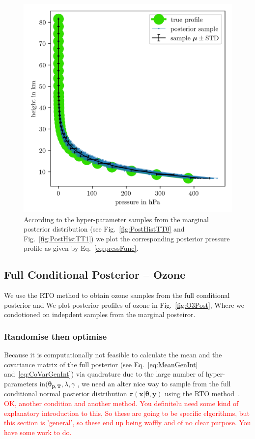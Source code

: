 \begin{figure}[ht!]
	\centering
	\includegraphics{PressPostMeanSigm.png}
	\caption[Pressure posterior samples.]{According to the hyper-parameter samples from the marginal posterior distribution (see Fig.~\ref{fig:PostHistTT0} and Fig.~\ref{fig:PostHistTT1}) we plot the corresponding posterior pressure profile as given by Eq.~\ref{eq:pressFunc}.}
	\label{fig:PressPost}
\end{figure}
\clearpage
\subsection{Full Conditional Posterior -- Ozone}
We use the RTO method to obtain ozone samples from the full conditional posterior and 
We plot posterior profiles of ozone in Fig.~\ref{fig:O3Post}, 
Where we condotioned on indepdent samples from the marginal posteiror.


\subsubsection{Randomise then optimise}
\label{subsec:RTO} 
Because it is computationally not feasible to calculate the mean and the covariance matrix of the full posterior (see Eq.~\ref{eq:MeanGenInt} and~\ref{eq:CoVarGenInt}) via quadrature due to the large number of hyper-parameters in$( \bm{\theta}_{\bm{p}, \bm{T}},\lambda,\gamma $ , we need an alter nice way to sample from the full conditional normal posterior distribution $\pi(\bm{x} |  \bm{\theta}, \bm{y})$ using the RTO method~\cite{bardsley2012mcmc}.
\textcolor{red}{OK, another condition and another method. You definitelu need some kind of explanatory introduction to this, So these are going to be specific elgorithms, but this section is 'general', so these end up being waffly and of no clear purpose. You have some work to do.}

